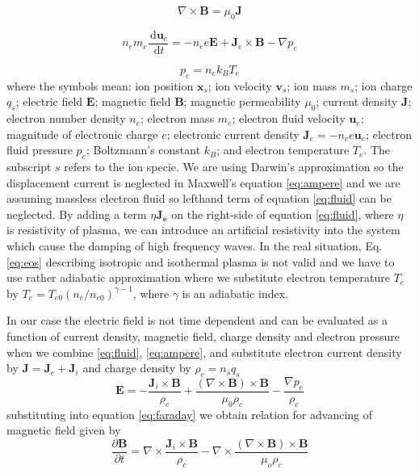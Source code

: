 \documentclass[oneside,branding,toc,article]{sat}
\newcommand{\mbf}[1]{\mathbf{#1}}              %
\begin{document}
\begin{equation}
  \nabla \times \mathbf{B} = \mu_0 \mathbf{J}
  \label{eq:ampere}
\end{equation}

\begin{equation}
  n_e m_e \frac{\, {\mathrm d}{\mathbf{u}_e}}{\, {\mathrm d}{t}} =
  - n_e e \mathbf{E} + \mathbf{J}_e \times \mathbf{B} - \nabla p_e
  \label{eq:fluid}
\end{equation}

\begin{equation}
  p_e = n_e k_B T_e
  \label{eq:eos}
\end{equation}
where the symbols mean: ion position $\mbf{x}_s$; ion velocity $\mbf{v}_s$; ion
mass $m_s$; ion charge $q_s$; electric field $\mbf{E}$; magnetic field
$\mbf{B}$; magnetic permeability $\mu_0$; current density $\mbf{J}$; electron
number density $n_e$; electron mass $m_e$; electron fluid velocity $\mbf{u}_e$;
magnitude of electronic charge $e$; electronic current density $\mbf{J}_e = -
n_e e \mbf{u}_e$; electron fluid pressure $p_e$; Boltzmann's constant $k_B$;
and electron temperature $T_e$. The subscript $s$ refers to the ion specie. We
are using Darwin's approximation so the displacement current is neglected in
Maxwell's equation \ref{eq:ampere} and we are assuming massless electron fluid
so lefthand term of equation \ref{eq:fluid} can be neglected. By adding a term
$\eta \mathbf{J_e}$ on the right-side of equation \ref{eq:fluid}, where $\eta$
is resistivity of plasma, we can introduce an artificial resistivity into the
system which cause the damping of high frequency waves.  In the real situation,
Eq. \ref{eq:eos} describing isotropic and isothermal plasma is not valid and we
have to use rather adiabatic approximation where we substitute electron
temperature $T_e$ by $T_e = T_{e0} (n_e / n_{e0})^{\gamma - 1}$, where $\gamma$
is an adiabatic index.

In our case the electric field is not time dependent and can be evaluated as a
function of current density, magnetic field, charge density and electron
pressure when we combine \ref{eq:fluid}, \ref{eq:ampere}, and substitute
electron current density by $\mbf{J} = \mbf{J}_e + \mbf{J}_i$ and charge
density by $\rho_c = n_s q_s$
\begin{equation}
  \label{eq:e}
  \mbf{E} = - \frac{\mbf{J}_i \times \mbf{B}}{\rho_c} +
  \frac{(\nabla \times \mbf{B}) \times \mbf{B}}{\mu_0 \rho_c} -
  \frac{\nabla p_e}{\rho_c}
\end{equation}
substituting into equation \ref{eq:faraday} we obtain relation for advancing of
magnetic field given by
\begin{equation}
  \label{eq:b}
  \frac{\partial \mbf{B}}{\partial t} =
  \nabla \times \frac{\mbf{J}_i \times \mbf{B}}{\rho_c} -
  \nabla \times \frac{(\nabla \times \mbf{B}) \times \mbf{B}}{\mu_o \rho_c}
\end{equation}
\end{document}
